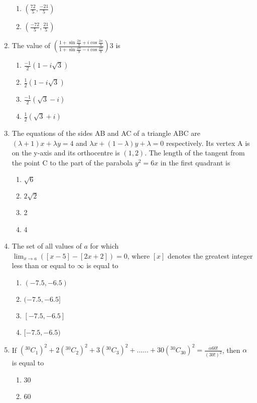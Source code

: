 \documentclass[journal]{IEEEtran}
\begin{document}
\begin{enumerate}
\begin{enumerate}
    \item $ \left( \frac{72}{5},\frac{-21}{5} \right)$
    \item $ \left( \frac{-72}{5},\frac{21}{5} \right)$
\end{enumerate}
\item The value of $\left( \frac{1+\sin{\frac{2\pi}{9}}+i\cos{\frac{2\pi}{9}}}{1+\sin{\frac{2\pi}{9}}-i\cos{\frac{2\pi}{9}}} \right){3}$ is
\begin{enumerate}
    \item $\frac{-1}{2} (1-i\sqrt{3})$
    \item $ \frac{1}{2} (1-i\sqrt{3})$
    \item $ \frac{-1}{2} (\sqrt{3}-i) $
    \item $ \frac{1}{2} (\sqrt{3}+i) $
\end{enumerate}
\item The equations of the sides AB and AC of a triangle
ABC are \\
$(\lambda + 1) x + \lambda y = 4 $ and $ \lambda x + (1-\lambda) y + \lambda = 0$
 respectively. Its vertex A is on the y-axis and its
orthocentre is $(1, 2)$. The length of the tangent
from the point C to the part of the parabola $y^{2}
 = 6x$
in the first quadrant is 
\begin{enumerate}
    \item $\sqrt{6}$
    \item $2\sqrt{2}$
    \item 2
    \item 4
\end{enumerate}
\item The set of all values of $a$ for which \\
$\lim_{x \to a} ([x-5]-[2x+2])=0$, where $[x]$ denotes the greatest integer less than or equal to $\infty$ is equal to 
\begin{enumerate}
    \item $(-7.5, -6.5)$
    \item $(-7.5, -6.5] $
    \item $[-7.5, -6.5] $
    \item $[-7.5, -6.5) $
\end{enumerate}
\item If $ ({}^{30}C_{1})^{2} + 2({}^{30}C_{2})^{2} + 3({}^{30}C_{3})^{2} +......+ 30({}^{30}C_{30})^{2} = \frac{\alpha60!}{(30!)^{2}} $, then $\alpha$ is equal to 
\begin{enumerate}
    \item 30
    \item 60

\end{enumerate}
\end{enumerate}
\end{document}
